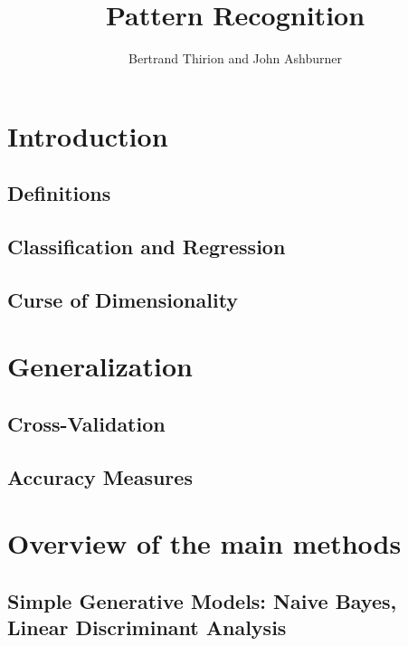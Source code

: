 \documentclass{beamer}
\title{Pattern Recognition}
\author{Bertrand Thirion and John Ashburner}
\date{}
\begin{document}
\begin{frame}
\titlepage
\end{frame}

\section{Introduction}
    \subsection{Definitions}                                                 
    \subsection{Classification and Regression}                               
    \subsection{Curse of Dimensionality}                                     
\section{Generalization}
    \subsection{Cross-Validation}                                            
    \subsection{Accuracy Measures}                                           
\section{Overview of the main methods}

    \subsection{Simple Generative Models: Naive Bayes, Linear Discriminant Analysis}       
\end{document}
